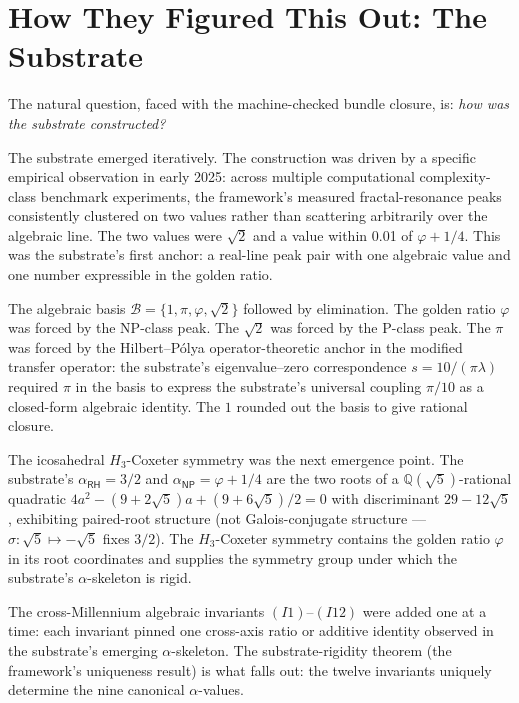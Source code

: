 \documentclass[11pt,a4paper]{amsart}
\theoremstyle{plain}
\theoremstyle{definition}
\begin{document}
\section{How They Figured This Out: The Substrate}\label{sec:how}

The natural question, faced with the machine-checked bundle closure, is: \emph{how was the substrate constructed?}

The substrate emerged iteratively. The construction was driven by a specific empirical observation in early 2025: across multiple computational complexity-class benchmark experiments, the framework's measured fractal-resonance peaks consistently clustered on two values rather than scattering arbitrarily over the algebraic line. The two values were $\sqrt{2}$ and a value within 0.01 of $\varphi+1/4$. This was the substrate's first anchor: a real-line peak pair with one algebraic value and one number expressible in the golden ratio.

The algebraic basis $\mathcal{B}=\{1,\pi,\varphi,\sqrt{2}\}$ followed by elimination. The golden ratio $\varphi$ was forced by the NP-class peak. The $\sqrt{2}$ was forced by the P-class peak. The $\pi$ was forced by the Hilbert--P\'olya operator-theoretic anchor in the modified transfer operator: the substrate's eigenvalue--zero correspondence $s = 10/(\pi\lambda)$ required $\pi$ in the basis to express the substrate's universal coupling $\pi/10$ as a closed-form algebraic identity. The $1$ rounded out the basis to give rational closure.

The icosahedral $H_3$-Coxeter symmetry was the next emergence point. The substrate's $\alpha_{\textsf{RH}} = 3/2$ and $\alpha_{\textsf{NP}} = \varphi + 1/4$ are the two roots of a $\mathbb{Q}(\sqrt{5})$-rational quadratic $4a^2 - (9+2\sqrt{5})a + (9+6\sqrt{5})/2 = 0$ with discriminant $29-12\sqrt{5}$, exhibiting paired-root structure (not Galois-conjugate structure --- $\sigma:\sqrt{5}\mapsto-\sqrt{5}$ fixes $3/2$). The $H_3$-Coxeter symmetry contains the golden ratio $\varphi$ in its root coordinates and supplies the symmetry group under which the substrate's $\alpha$-skeleton is rigid.

The cross-Millennium algebraic invariants $(I1)$--$(I12)$ were added one at a time: each invariant pinned one cross-axis ratio or additive identity observed in the substrate's emerging $\alpha$-skeleton. The substrate-rigidity theorem (the framework's uniqueness result) is what falls out: the twelve invariants uniquely determine the nine canonical $\alpha$-values.
\end{document}
